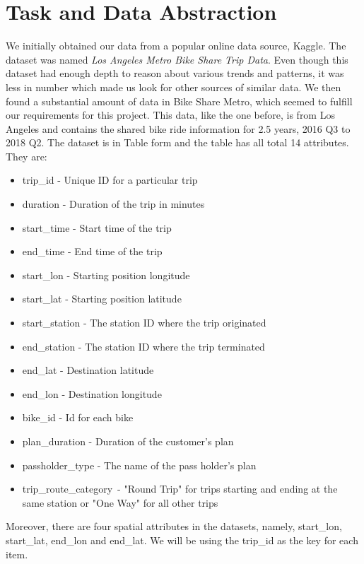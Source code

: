 \section{Task and Data Abstraction} 
\label{sec:task_and_data_abstraction}

We initially obtained our data from a popular online data source, Kaggle. The dataset was named \textit{Los Angeles Metro Bike Share Trip Data}. Even though this dataset had enough depth to reason about various trends and patterns, it was less in number which made us look for other sources of similar data. We then found a substantial amount of data in Bike Share Metro, which seemed to fulfill our requirements for this project. This data, like the one before, is from Los Angeles and contains the shared bike ride information for 2.5 years, 2016 Q3 to 2018 Q2. 
The dataset is in Table form and the table has all total 14 attributes. They are:
\begin{itemize}
    \item trip\_id - Unique ID for a particular trip
    \item duration - Duration of the trip in minutes
    \item start\_time - Start time of the trip
    \item end\_time - End time of the trip
    \item start\_lon - Starting position longitude
    \item start\_lat - Starting position latitude
    \item start\_station - The station ID where the trip originated
    \item end\_station -  The station ID where the trip terminated
    \item end\_lat - Destination latitude
    \item end\_lon - Destination longitude
    \item bike\_id - Id for each bike
    \item plan\_duration - Duration of the customer's plan
    \item passholder\_type - The name of the pass holder's plan
    \item trip\_route\_category\ -  "Round Trip" for trips starting and ending at the same station or "One Way" for all other trips
\end{itemize}
Moreover, there are four spatial attributes in the datasets, namely, start\_lon, start\_lat, end\_lon and end\_lat. We will be using the trip\_id as the key for each item.

